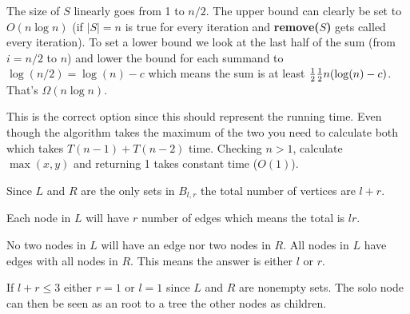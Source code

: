 \documentclass[a4paper]{article}
\newenvironment{task}[1]
{
	\begin{description}[align=right]
		\item [#1]
}{		%
	\end{description}
}
\newcommand{\abs}[1]{\left|#1\right|}
\let\*\relax
\DeclareMathOperator{\*}{\cdot}
\begin{document}
\begin{task}{(b)}
	 The size of $S$ linearly goes from 1 to $n/2$. The upper bound can clearly be set to $O(n\log n)$ (if  $\abs{S}=n$ is true for every iteration and \textbf{remove($S$)} gets called every iteration). To set a lower bound we look at the last half of the sum (from $i=n/2$ to $n$) and lower the bound for each summand to $\log (n/2)=\log (n)-c$ which means the sum is at least $\frac{1}{2}\*\frac{1}{2}\*n\*(\log(n)-c)$. That’s $\Omega(n\log n)$.
\end{task}

\begin{task}{4. (a)}
	 This is the correct option since this should represent the running time. Even though the algorithm takes the maximum of the two you need to calculate both which takes $T(n-1)+T(n-2)$ time. Checking $n > 1$, calculate $\max(x,y)$ and returning 1 takes constant time ($O(1)$).
\end{task}

\begin{task}{5. (a)}
	 Since $L$ and $R$ are the only sets in $B_{l,r}$ the total number of vertices are $l+r$.
\end{task}

\begin{task}{(b)}
	 Each node in $L$ will have $r$ number of edges which means the total is $lr$.
\end{task}

\begin{task}{(c)}
	 No two nodes in $L$ will have an edge nor two nodes in $R$. All nodes in $L$ have edges with all nodes in $R$. This means the answer is either $l$ or $r$.
\end{task}

\begin{task}{(d)}
	 If $l+r\leq 3$ either $r=1$ or $l=1$ since $L$ and $R$ are nonempty sets. The solo node can then be seen as an root to a tree the other nodes as children.
\end{task}
\end{document}
